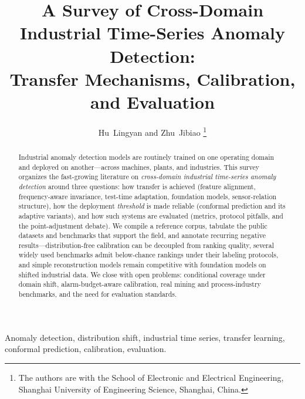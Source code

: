 \documentclass[journal]{IEEEtran}
\title{A Survey of Cross-Domain Industrial Time-Series Anomaly Detection:\\ Transfer Mechanisms, Calibration, and Evaluation}
\author{Hu~Lingyan and Zhu~Jibiao
\thanks{The authors are with the School of Electronic and Electrical Engineering, Shanghai University of Engineering Science, Shanghai, China.}}
\begin{document}
\maketitle

\begin{abstract}
Industrial anomaly detection models are routinely trained on one operating domain and deployed on another---across machines, plants, and industries. This survey organizes the fast-growing literature on \emph{cross-domain industrial time-series anomaly detection} around three questions: how transfer is achieved (feature alignment, frequency-aware invariance, test-time adaptation, foundation models, sensor-relation structure), how the deployment \emph{threshold} is made reliable (conformal prediction and its adaptive variants), and how such systems are evaluated (metrics, protocol pitfalls, and the point-adjustment debate). We compile a reference corpus, tabulate the public datasets and benchmarks that support the field, and annotate recurring negative results---distribution-free calibration can be decoupled from ranking quality, several widely used benchmarks admit below-chance rankings under their labeling protocols, and simple reconstruction models remain competitive with foundation models on shifted industrial data. We close with open problems: conditional coverage under domain shift, alarm-budget-aware calibration, real mining and process-industry benchmarks, and the need for evaluation standards.
\end{abstract}

\begin{IEEEkeywords}
Anomaly detection, distribution shift, industrial time series, transfer learning, conformal prediction, calibration, evaluation.
\end{IEEEkeywords}








\end{document}
